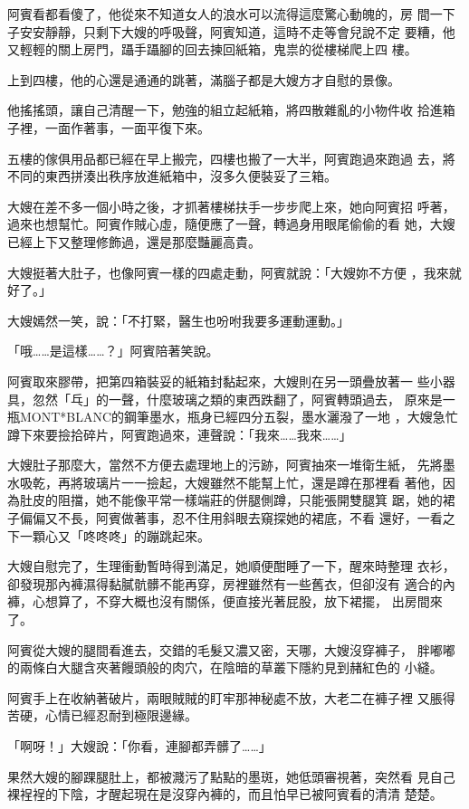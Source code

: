 阿賓看都看傻了，他從來不知道女人的浪水可以流得這麼驚心動魄的，房
間一下子安安靜靜，只剩下大嫂的呼吸聲，阿賓知道，這時不走等會兒說不定
要糟，他又輕輕的關上房門，躡手躡腳的回去揀回紙箱，鬼祟的從樓梯爬上四
樓。

上到四樓，他的心還是通通的跳著，滿腦子都是大嫂方才自慰的景像。

他搖搖頭，讓自己清醒一下，勉強的組立起紙箱，將四散雜亂的小物件收
拾進箱子裡，一面作著事，一面平復下來。

五樓的傢俱用品都已經在早上搬完，四樓也搬了一大半，阿賓跑過來跑過
去，將不同的東西拼湊出秩序放進紙箱中，沒多久便裝妥了三箱。

大嫂在差不多一個小時之後，才抓著樓梯扶手一步步爬上來，她向阿賓招
呼著，過來也想幫忙。阿賓作賊心虛，隨便應了一聲，轉過身用眼尾偷偷的看
她，大嫂已經上下又整理修飾過，還是那麼豔麗高貴。

大嫂挺著大肚子，也像阿賓一樣的四處走動，阿賓就說：「大嫂妳不方便
，我來就好了。」

大嫂嫣然一笑，說：「不打緊，醫生也吩咐我要多運動運動。」

「哦……是這樣……？」阿賓陪著笑說。

阿賓取來膠帶，把第四箱裝妥的紙箱封黏起來，大嫂則在另一頭疊放著一
些小器具，忽然「乓」的一聲，什麼玻璃之類的東西跌翻了，阿賓轉頭過去，
原來是一瓶MONT*BLANC的鋼筆墨水，瓶身已經四分五裂，墨水灑潑了一地
，大嫂急忙蹲下來要撿拾碎片，阿賓跑過來，連聲說：「我來……我來……」

大嫂肚子那麼大，當然不方便去處理地上的污跡，阿賓抽來一堆衛生紙，
先將墨水吸乾，再將玻璃片一一撿起，大嫂雖然不能幫上忙，還是蹲在那裡看
著他，因為肚皮的阻擋，她不能像平常一樣端莊的併腿側蹲，只能張開雙腿箕
踞，她的裙子偏偏又不長，阿賓做著事，忍不住用斜眼去窺探她的裙底，不看
還好，一看之下一顆心又「咚咚咚」的蹦跳起來。

大嫂自慰完了，生理衝動暫時得到滿足，她順便酣睡了一下，醒來時整理
衣衫，卻發現那內褲濕得黏膩骯髒不能再穿，房裡雖然有一些舊衣，但卻沒有
適合的內褲，心想算了，不穿大概也沒有關係，便直接光著屁股，放下裙擺，
出房間來了。

阿賓從大嫂的腿間看進去，交錯的毛髮又濃又密，天哪，大嫂沒穿褲子，
胖嘟嘟的兩條白大腿含夾著饅頭般的肉穴，在陰暗的草叢下隱約見到赭紅色的
小縫。

阿賓手上在收納著破片，兩眼賊賊的盯牢那神秘處不放，大老二在褲子裡
又脹得苦硬，心情已經忍耐到極限邊緣。

「啊呀！」大嫂說：「你看，連腳都弄髒了……」

果然大嫂的腳踝腿肚上，都被濺污了點點的墨斑，她低頭審視著，突然看
見自己裸裎裎的下陰，才醒起現在是沒穿內褲的，而且怕早已被阿賓看的清清
楚楚。

